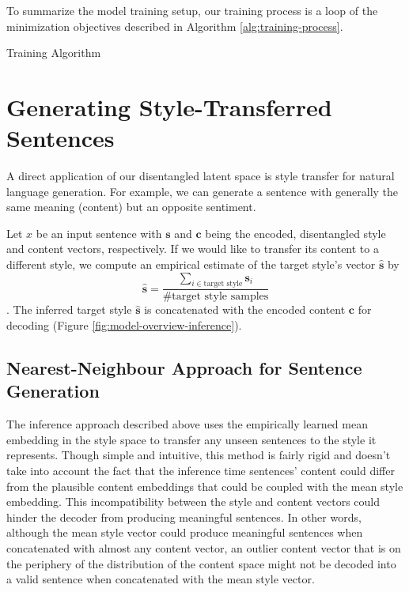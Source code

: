 To summarize the model training setup, our training process is a loop of the minimization objectives described in Algorithm \ref{alg:training-process}.

\begin{algorithm}[H]
	\caption{\label{alg:training-process} Training Algorithm}
\end{algorithm}


\section{Generating Style-Transferred Sentences} \label{ssec:generating-novel-text}

A direct application of our disentangled latent space is style transfer for natural language generation. For example, we can generate a sentence with generally the same meaning (content) but an opposite sentiment.

Let $x$ be an input sentence with $\bm s$ and $\bm c$ being the encoded, disentangled style and content vectors, respectively. If we would like to transfer its content to a different style, we compute an empirical estimate of the target style's vector $\hat{\bm s}$ by
$$\hat{\bm s}=\frac{\sum_{i\in\text{target style}}\bm s_i}{\text{\# target style samples}}$$. The inferred target style $\hat{\bm s}$ is concatenated with the encoded content $\bm c$ for decoding (Figure \ref{fig:model-overview-inference}).


\subsection{Nearest-Neighbour Approach for Sentence Generation} \label{ssec:nearest-neighbour-inference}

The inference approach described above uses the empirically learned mean embedding in the style space to transfer any unseen sentences to the style it represents. Though simple and intuitive, this method is fairly rigid and doesn't take into account the fact that the inference time sentences' content could differ from the plausible content embeddings that could be coupled with the mean style embedding. This incompatibility between the style and content vectors could hinder the decoder from producing meaningful sentences. In other words, although the mean style vector could produce meaningful sentences when concatenated with almost any content vector, an outlier content vector that is on the periphery of the distribution of the content space might not be decoded into a valid sentence when concatenated with the mean style vector.


